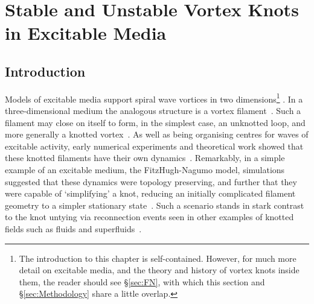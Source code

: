 \chapter{Stable and Unstable Vortex Knots in Excitable Media}
\label{ch:FitzHughNagumo}
\section{\label{sec:Introduction}Introduction}
Models of excitable media support spiral wave vortices in two dimensions\footnote{The introduction to this chapter is self-contained. However, for much more detail on excitable media, and the theory and history of vortex knots inside them, the reader should see \S\ref{sec:FN}, with which this section and \S\ref{sec:Methodology} share a little overlap.} . In a three-dimensional medium the analogous structure is a vortex filament~\citep{Winfree1983}. Such a filament may close on itself to form, in the simplest case, an unknotted loop, and more generally a knotted vortex~\citep{Winfree1983b}. As well as being organising centres for waves of excitable activity, early numerical experiments and theoretical work showed that these knotted filaments have their own dynamics~\citep{Keener1988,Winfree1990, Keener1992,Henze1993, Biktashev1994,WinfreeChapter,Dierckx2010}. Remarkably, in a simple example of an excitable medium, the FitzHugh-Nagumo model, simulations suggested that these dynamics were topology preserving, and further that they were capable of `simplifying' a knot, reducing an initially complicated filament geometry to a simpler stationary state~\citep{Winfree1990,Henze1993,WinfreeChapter}. Such a scenario stands in stark contrast to the knot untying via reconnection events seen in other examples of knotted fields such as fluids and superfluids~\citep{Kleckner2013,Scheeler2014,Kleckner2016}. 

